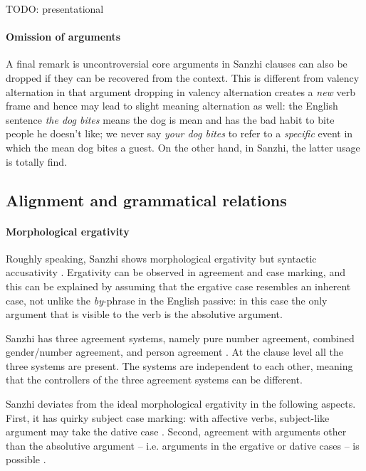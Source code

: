 \documentclass[a4paper, oneside, 12pt]{report}
\newcommand*{\citesec}[1]{\S~{#1}}
\newcommand*{\citetable}[1]{Table~{#1}}
\newcommand*{\citepage}[1]{p.~{#1}}
\newcommand{\form}[1]{\emph{#1}}
\begin{document}
TODO: presentational

\paragraph*{Omission of arguments} 
A final remark is uncontroversial core arguments in Sanzhi clauses can also be dropped 
if they can be recovered from the context.
This is different from valency alternation in that 
argument dropping in valency alternation creates a \emph{new} verb frame 
and hence may lead to slight meaning alternation as well:
the English sentence \form{the dog bites} means 
the dog is mean and has the bad habit to bite people he doesn't like; 
we never say \form{your dog bites} to refer to a \emph{specific} event 
in which the mean dog bites a guest.
On the other hand, in Sanzhi, the latter usage is totally find.  

\subsection{Alignment and grammatical relations} 

\paragraph*{Morphological ergativity}
Roughly speaking, Sanzhi shows morphological ergativity 
but syntactic accusativity \citep[\citesec{22.3}]{forker2020grammar}.
Ergativity can be observed in agreement and case marking, 
and this can be explained by assuming that 
the ergative case resembles an inherent case, 
not unlike the \form{by}-phrase in the English passive:
in this case the only argument that is visible to the verb 
is the absolutive argument.

Sanzhi has three agreement systems, 
namely pure number agreement, 
combined gender/number agreement, 
and person agreement \citep[\citepage{373}]{forker2020grammar}.
At the clause level all the three systems are present.
The systems are independent to each other, 
meaning that the controllers of the three agreement systems can be different.


Sanzhi deviates from the ideal morphological ergativity
in the following aspects.
First, it has quirky subject case marking: 
with affective verbs, subject-like argument may take the dative case 
\citep[\citetable{19.1}]{forker2020grammar}.
Second, agreement with arguments other than the absolutive argument
-- i.e. arguments in the ergative or dative cases --
is possible \citep[\citesec{20.2.4}]{forker2020grammar}.
\end{document}
